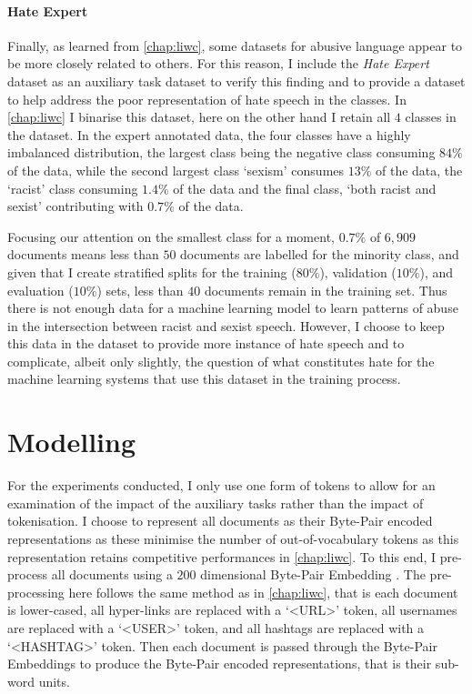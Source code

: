 \paragraph{Hate Expert}
Finally, as learned from \cref{chap:liwc}, some datasets for abusive language appear to be more closely related to others.
For this reason, I include the \textit{Hate Expert} dataset as an auxiliary task dataset to verify this finding and to provide a dataset to help address the poor representation of hate speech in the classes.
In \cref{chap:liwc} I binarise this dataset, here on the other hand I retain all $4$ classes in the dataset. 
In the expert annotated data, the four classes have a highly imbalanced distribution, the largest class being the negative class consuming $84\%$ of the data, while the second largest class `sexism' consumes $13\%$ of the data, the `racist' class consuming $1.4\%$ of the data and the final class, `both racist and sexist' contributing with $0.7\%$ of the data.

Focusing our attention on the smallest class for a moment, $0.7\%$ of $6,909$ documents means less than $50$ documents are labelled for the minority class, and given that I create stratified splits for the training ($80\%$), validation ($10\%$), and evaluation ($10\%$) sets, less than $40$ documents remain in the training set.
Thus there is not enough data for a machine learning model to learn patterns of abuse in the intersection between racist and sexist speech.
However, I choose to keep this data in the dataset to provide more instance of hate speech and to complicate, albeit only slightly, the question of what constitutes hate for the machine learning systems that use this dataset in the training process.

\section{Modelling}
For the experiments conducted, I only use one form of tokens to allow for an examination of the impact of the auxiliary tasks rather than the impact of tokenisation.
I choose to represent all documents as their Byte-Pair encoded representations as these minimise the number of out-of-vocabulary tokens as this representation retains competitive performances in \cref{chap:liwc}.
To this end, I pre-process all documents using a $200$ dimensional Byte-Pair Embedding \citep{Heinzerling:2018}.
The pre-processing here follows the same method as in \cref{chap:liwc}, that is each document is lower-cased, all hyper-links are replaced with a `<URL>' token, all usernames are replaced with a `<USER>' token, and all hashtags are replaced with a `<HASHTAG>' token.
Then each document is passed through the Byte-Pair Embeddings to produce the Byte-Pair encoded representations, that is their sub-word units.

